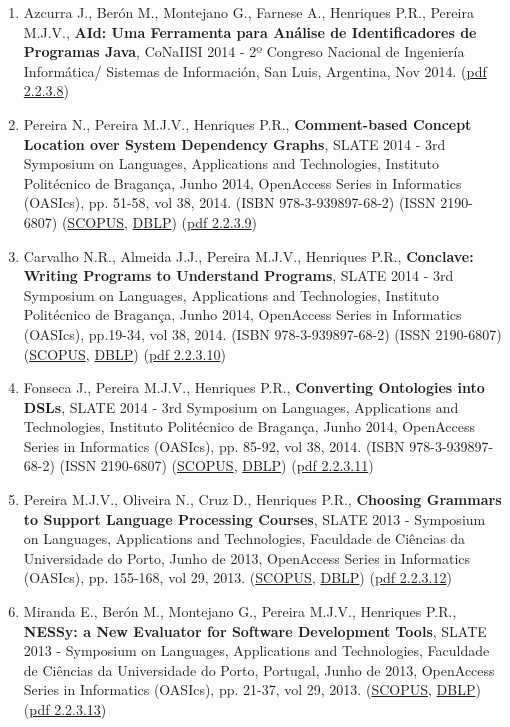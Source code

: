 \documentclass[11pt]{article}
\begin{document}
\begin{enumerate}
\item {Azcurra J., Berón M., Montejano G., Farnese A., Henriques P.R., Pereira M.J.V., {\bf{ AId: Uma Ferramenta para Análise de Identificadores de Programas Java}}, CoNaIISI 2014 - 2º Congreso Nacional de Ingeniería Informática/ Sistemas de Información, San Luis, Argentina, Nov 2014. (\href{run:Publicacoes/publicacoes/77.pdf}{pdf 2.2.3.8})}
\item {Pereira N., Pereira M.J.V., Henriques P.R., {\bf{ Comment-based Concept Location over System Dependency Graphs}}, SLATE 2014 - 3rd Symposium on Languages, Applications and Technologies, Instituto Politécnico de Bragança, Junho 2014, OpenAccess Series in Informatics (OASIcs), pp. 51-58, vol 38, 2014. (ISBN 978-3-939897-68-2) (ISSN 2190-6807) (\href{run:Publicacoes/PublicacoesSCOPUS.pdf}{SCOPUS}, \href{run:Publicacoes/ComprovativosDBLP.pdf}{DBLP}) (\href{run:Publicacoes/publicacoes/75.pdf}{pdf 2.2.3.9})}
\item {Carvalho N.R., Almeida J.J., Pereira M.J.V., Henriques P.R., {\bf{ Conclave: Writing Programs to Understand Programs}}, SLATE 2014 - 3rd Symposium on Languages, Applications and Technologies, Instituto Politécnico de Bragança, Junho 2014, OpenAccess Series in Informatics (OASIcs),  pp.19-34, vol 38, 2014. (ISBN 978-3-939897-68-2) (ISSN 2190-6807) (\href{run:Publicacoes/PublicacoesSCOPUS.pdf}{SCOPUS}, \href{run:Publicacoes/ComprovativosDBLP.pdf}{DBLP}) (\href{run:Publicacoes/publicacoes/73.pdf}{pdf 2.2.3.10})}
\item {Fonseca J., Pereira M.J.V., Henriques P.R., {\bf{ Converting Ontologies into DSLs}}, SLATE 2014 - 3rd Symposium on Languages, Applications and Technologies, Instituto Politécnico de Bragança, Junho 2014, OpenAccess Series in Informatics (OASIcs), pp. 85-92, vol 38, 2014. (ISBN 978-3-939897-68-2) (ISSN 2190-6807) (\href{run:Publicacoes/PublicacoesSCOPUS.pdf}{SCOPUS}, \href{run:Publicacoes/ComprovativosDBLP.pdf}{DBLP}) (\href{run:Publicacoes/publicacoes/76.pdf}{pdf 2.2.3.11})}
\item {Pereira M.J.V., Oliveira N., Cruz D., Henriques P.R., {\bf{ Choosing Grammars to Support Language Processing Courses}}, SLATE 2013 - Symposium on Languages, Applications and Technologies, Faculdade de Ciências da Universidade do Porto, Junho de 2013, OpenAccess Series in Informatics (OASIcs), pp. 155-168, vol 29, 2013. (\href{run:Publicacoes/PublicacoesSCOPUS.pdf}{SCOPUS}, \href{run:Publicacoes/ComprovativosDBLP.pdf}{DBLP}) (\href{run:Publicacoes/publicacoes/71.pdf}{pdf 2.2.3.12})}
\item {Miranda E., Berón M., Montejano G., Pereira M.J.V., Henriques P.R., {\bf{ NESSy: a New Evaluator for Software Development Tools}}, SLATE 2013 - Symposium on Languages, Applications and Technologies, Faculdade de Ciências da Universidade do Porto, Portugal, Junho de 2013, OpenAccess Series in Informatics (OASIcs), pp. 21-37, vol 29, 2013. (\href{run:Publicacoes/PublicacoesSCOPUS.pdf}{SCOPUS}, \href{run:Publicacoes/ComprovativosDBLP.pdf}{DBLP}) (\href{run:Publicacoes/publicacoes/72.pdf}{pdf 2.2.3.13})}

\end{enumerate}
\end{document}
